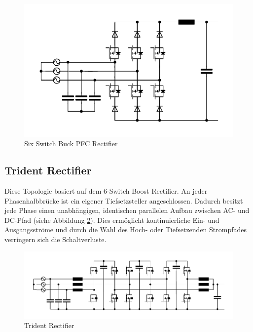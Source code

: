 		\begin{figure}
			\centering
			\includegraphics[width=1\linewidth]{content/Grafiken/SixSwitchBuck}
			\caption{Six Switch Buck PFC Rectifier}
			\label{fig:sixswitchbuck}
		\end{figure}
		
		\subsection{Trident Rectifier}
		Diese Topologie basiert auf dem 6-Switch Boost Rectifier. An jeder Phasenhalbbrücke ist ein eigener Tiefsetzsteller angeschlossen. Dadurch besitzt jede Phase einen unabhängigen, identischen parallelen Aufbau zwischen AC- und DC-Pfad (siehe Abbildung \ref{fig:trident}). Dies ermöglicht kontinuierliche Ein- und Ausgangsströme und durch die Wahl des Hoch- oder Tiefsetzenden Strompfades verringern sich die Schaltverluste.
		\begin{figure}
			\centering
			\includegraphics[width=1\linewidth]{content/Grafiken/Trident}
			\caption{Trident Rectifier}
			\label{fig:trident}
		\end{figure}
		
